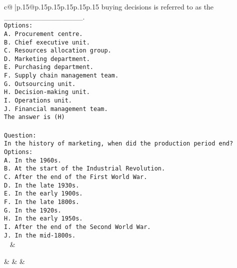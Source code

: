 \documentclass{article}
\begin{document}
{\begin{supertabular}{c@{$\;$}|p{.15\linewidth}@{}p{.15\linewidth}p{.15\linewidth}p{.15\linewidth}p{.15\linewidth}p{.15\linewidth}}
{{{buying decisions is referred to as the _______________.\\ \tt Options:\\ \tt A. Procurement centre.\\ \tt B. Chief executive unit.\\ \tt C. Resources allocation group.\\ \tt D. Marketing department.\\ \tt E. Purchasing department.\\ \tt F. Supply chain management team.\\ \tt G. Outsourcing unit.\\ \tt H. Decision-making unit.\\ \tt I. Operations unit.\\ \tt J. Financial management team.\\ \tt The answer is (H)\\ \tt \\ \tt Question:\\ \tt In the history of marketing, when did the production period end?\\ \tt Options:\\ \tt A. In the 1960s.\\ \tt B. At the start of the Industrial Revolution.\\ \tt C. After the end of the First World War.\\ \tt D. In the late 1930s.\\ \tt E. In the early 1900s.\\ \tt F. In the late 1800s.\\ \tt G. In the 1920s.\\ \tt H. In the early 1950s.\\ \tt I. After the end of the Second World War.\\ \tt J. In the mid-1800s.\\ \tt  
	  } 
	   } 
	   } 
	 & \\ 
 

    \theutterance {}  

    &  
	 & & \\ 
 


\end{supertabular}}
\end{document}
